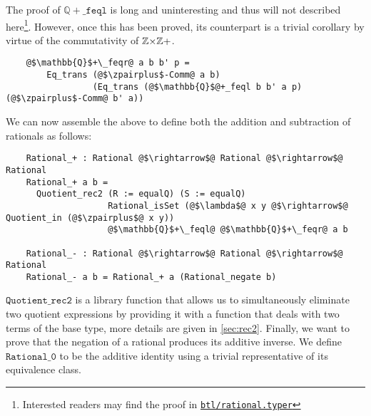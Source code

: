 \documentclass[12pt,twoside,maitrise]{dms}
\theoremstyle{definition}
\numberwithin{equation}{section}
\numberwithin{table}{chapter}
\numberwithin{figure}{chapter}
\newcommand\id[1] {\texttt{#1}}
\begin{document}
The proof of $\mathbb{Q}{+}\_\id{feql}$ is long and uninteresting and thus will
not described here\footnote{Interested readers may find the proof in
\href{https://gitlab.com/jamestjw/typer/-/blob/quot-types-v1.0.0/btl/rational.typer}{\id{btl/rational.typer}}}.
However, once this has been proved, its counterpart is a trivial corollary by
virtue of the commutativity of $\mathbb{Z}{\times}\mathbb{Z}+$.

\begin{verbatim}
    @$\mathbb{Q}$+\_feqr@ a b b' p =
        Eq_trans (@$\zpairplus$-Comm@ a b)
                 (Eq_trans (@$\mathbb{Q}$@+_feql b b' a p) (@$\zpairplus$-Comm@ b' a))
\end{verbatim}

We can now assemble the above to define both the addition and subtraction of
rationals as follows:

\begin{verbatim}
    Rational_+ : Rational @$\rightarrow$@ Rational @$\rightarrow$@ Rational
    Rational_+ a b =
      Quotient_rec2 (R := equalQ) (S := equalQ)
                    Rational_isSet (@$\lambda$@ x y @$\rightarrow$@ Quotient_in (@$\zpairplus$@ x y))
                    @$\mathbb{Q}$+\_feql@ @$\mathbb{Q}$+\_feqr@ a b

    Rational_- : Rational @$\rightarrow$@ Rational @$\rightarrow$@ Rational
    Rational_- a b = Rational_+ a (Rational_negate b)
\end{verbatim}

$\id{Quotient\_rec2}$ is a library function that allows us to simultaneously
eliminate two quotient expressions by providing it with a function that deals
with two terms of the base type, more details are given in \autoref{sec:rec2}.
Finally, we want to prove that the negation of a rational produces its additive
inverse. We define $\id{Rational\_0}$ to be the additive identity using a
trivial representative of its equivalence class.
\end{document}
